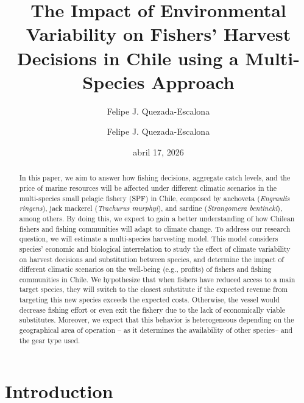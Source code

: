 \documentclass[
  11pt,
]{article}
\author{Felipe J. Quezada-Escalona}
\affil{Departmento de Economía \\ Universidad de Concepción \vspace{-48pt}}
\title{The Impact of Environmental Variability on Fishers' Harvest Decisions in Chile using a Multi-Species Approach}
\subtitle{\begin{center}{\color{red}\Large\textbf{REALLY EARLY DRAFT – PLEASE DO NOT CITE}}\end{center}}
\author{Felipe J. Quezada-Escalona}
\date{abril 17, 2026}
\begin{document}
\maketitle
\begin{abstract}
In this paper, we aim to answer how fishing decisions, aggregate catch levels, and the price of marine resources will be affected under different climatic scenarios in the multi-species small pelagic fishery (SPF) in Chile, composed by anchoveta (\emph{Engraulis ringens}), jack mackerel (\emph{Trachurus murphyi}), and sardine (\emph{Strangomera bentincki}), among others. By doing this, we expect to gain a better understanding of how Chilean fishers and fishing communities will adapt to climate change. To address our research question, we will estimate a multi-species harvesting model. This model considers species' economic and biological interrelation to study the effect of climate variability on harvest decisions and substitution between species, and determine the impact of different climatic scenarios on the well-being (e.g., profits) of fishers and fishing communities in Chile. We hypothesize that when fishers have reduced access to a main target species, they will switch to the closest substitute if the expected revenue from targeting this new species exceeds the expected costs. Otherwise, the vessel would decrease fishing effort or even exit the fishery due to the lack of economically viable substitutes. Moreover, we expect that this behavior is heterogeneous depending on the geographical area of operation -- as it determines the availability of other species-- and the gear type used.
\end{abstract}

\section{Introduction}\label{introduction}
\end{document}
